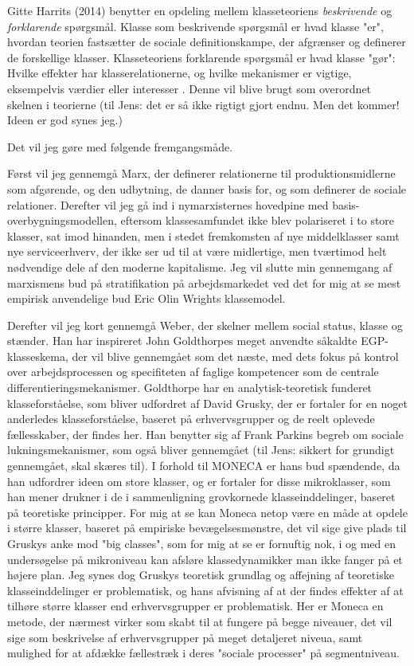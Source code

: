 Gitte Harrits (2014) benytter en opdeling mellem klasseteoriens \emph{beskrivende} og \emph{forklarende} spørgsmål. Klasse som beskrivende spørgsmål er hvad klasse "er", hvordan teorien fastsætter de sociale definitionskampe, der afgrænser og definerer de forskellige klasser. Klasseteoriens forklarende spørgsmål er hvad klasse "gør": Hvilke effekter har klasserelationerne, og hvilke mekanismer er vigtige, eksempelvis værdier eller interesser \parencite[19]{Harrits2014}. Denne vil blive brugt som overordnet skelnen i teorierne (til Jens: det er så ikke rigtigt gjort endnu. Men det kommer! Ideen er god synes jeg.)

Det vil jeg gøre med følgende fremgangsmåde. 

Først vil jeg gennemgå Marx, der definerer relationerne til produktionsmidlerne som afgørende, og den udbytning, de danner basis for, og som definerer de sociale relationer. Derefter vil jeg gå ind i nymarxisternes hovedpine med basis-overbygningsmodellen, eftersom klassesamfundet ikke blev polariseret i to store klasser, sat imod hinanden, men i stedet fremkomsten af nye middelklasser samt nye serviceerhverv, der ikke ser ud til at være midlertige, men tværtimod helt nødvendige dele af den moderne kapitalisme. Jeg vil slutte min gennemgang af marxismens bud på stratifikation på arbejdsmarkedet ved det for mig at se mest empirisk anvendelige bud Eric Olin Wrights klassemodel.

Derefter vil jeg kort gennemgå Weber, der skelner mellem social status, klasse og stænder. Han har inspireret John Goldthorpes meget anvendte såkaldte EGP-klasseskema, der vil blive gennemgået som det næste, med dets fokus på kontrol over arbejdsprocessen og specifiteten af faglige kompetencer som de centrale differentieringsmekanismer. Goldthorpe har en analytisk-teoretisk funderet klasseforståelse, som bliver udfordret af David Grusky, der er fortaler for en noget anderledes klasseforståelse, baseret på erhvervsgrupper og de reelt oplevede fællesskaber, der findes her. Han benytter sig af Frank Parkins begreb om sociale lukningsmekanismer, som også bliver gennemgået (til Jens: sikkert for grundigt gennemgået, skal skæres til). I forhold til MONECA er hans bud spændende, da han udfordrer ideen om store klasser, og er fortaler for disse mikroklasser, som han mener drukner i de i sammenligning grovkornede klasseinddelinger, baseret på teoretiske principper. For mig at se kan Moneca netop være en måde at opdele i større klasser, baseret på empiriske bevægelsesmønstre, det vil sige give plads til Gruskys anke mod "big classes", som for mig at se er fornuftig nok, i og med en undersøgelse på mikroniveau kan afsløre klassedynamikker man ikke fanger på et højere plan. Jeg synes dog Gruskys teoretisk grundlag og affejning af teoretiske klasseinddelinger er problematisk, og hans afvisning af at der findes effekter af at tilhøre større klasser end erhvervsgrupper er problematisk. Her er Moneca en metode, der nærmest virker som skabt til at fungere på begge niveauer, det vil sige som beskrivelse af erhvervsgrupper på meget detaljeret niveua, samt mulighed for at afdække fællestræk i deres "sociale processer" på segmentniveau.

